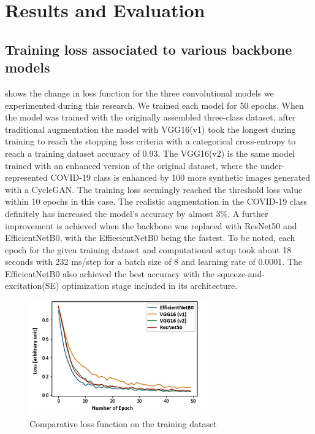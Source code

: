  
 






\section{Results and Evaluation}
\label{sec:results}

\subsection{Training loss associated to various backbone models}


 shows the change in loss function for the three convolutional models we experimented during this research. We trained each model for 50 epochs. When the model was trained with the originally assembled three-class dataset, after traditional augmentation the model with VGG16(v1) took the longest during training to reach the stopping loss criteria with a categorical cross-entropy to reach a training dataset accuracy of 0.93. The VGG16(v2) is the same model trained with an enhanced version of the original dataset, where the under-represented COVID-19 class is enhanced by 100 more synthetic images generated with a CycleGAN. The training loss seemingly reached the threshold loss value within 10 epochs in this case. The realistic augmentation in the COVID-19 class definitely has increased the model's accuracy by almost 3\%. A further improvement is achieved when the backbone was replaced with ResNet50 and EfficientNetB0, with the EffiecientNetB0 being the fastest. To be noted, each epoch for the given training dataset and computational setup took about 18 seconds with 232 ms/step for a batch size of 8 and learning rate of 0.0001. The EfficientNetB0  also achieved the best accuracy with the squeeze-and-excitation(SE) optimization stage included in its architecture.

\begin{figure}
\centering
\includegraphics[width=0.69\textwidth]{images/Loss_edit.png}
   \caption{Comparative loss function on the training dataset}
\label{fig:loss}
\end{figure}

